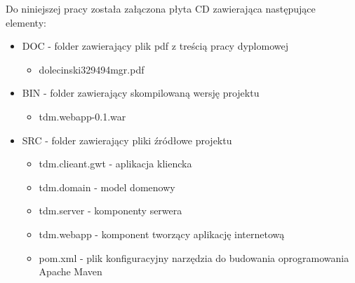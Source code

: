 Do niniejszej pracy została załączona płyta CD zawierająca następujące elementy:
\begin{itemize}
  \item DOC - folder zawierający plik pdf z treścią pracy dyplomowej
  \begin{itemize}
    \item dolecinski329494mgr.pdf
  \end{itemize}
  \item BIN - folder zawierający skompilowaną wersję projektu
  \begin{itemize}
    \item tdm.webapp-0.1.war
  \end{itemize}
  \item SRC - folder zawierający pliki źródłowe projektu
  \begin{itemize}
    \item tdm.clieant.gwt - aplikacja kliencka
    \item tdm.domain - model domenowy
    \item tdm.server - komponenty serwera
    \item tdm.webapp - komponent tworzący aplikację internetową
    \item pom.xml - plik konfiguracyjny narzędzia do budowania oprogramowania Apache Maven
  \end{itemize}
\end{itemize}
